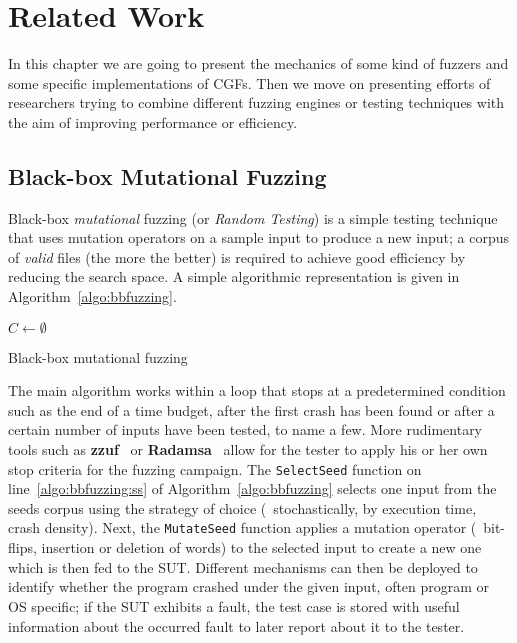 \chapter{Related Work}
\label{chap:related}

In this chapter we are going to present the mechanics of some kind of fuzzers
and some specific implementations of \acfp{CGF}. Then we move on presenting
efforts of researchers trying to combine different fuzzing engines or testing
techniques with the aim of improving performance or efficiency.

\section{Black-box Mutational Fuzzing}
\label{sec:bbfuzz}
Black-box \emph{mutational} fuzzing (or \emph{Random Testing}) is a simple
testing technique that uses mutation operators on a sample input to produce a
new input; a corpus of \emph{valid} files (the more the better) is required to
achieve good efficiency by reducing the search space. A simple algorithmic
representation is given in Algorithm~\ref{algo:bbfuzzing}.

\begin{algorithm}
    \DontPrintSemicolon%
    \BlankLine%
    $C \leftarrow \emptyset$\;
    \caption{Black-box mutational fuzzing}
\label{algo:bbfuzzing}
\end{algorithm}

The main algorithm works within a loop that stops at a predetermined condition
such as the end of a time budget, after the first crash has been found or after
a certain number of inputs have been tested, to name a few. More rudimentary
tools such as \textbf{zzuf}~\cite{hocevar2011zzuf} or
\textbf{Radamsa}~\cite{helin2015radamsa} allow for the tester to apply his or
her own stop criteria for the fuzzing campaign. The \texttt{SelectSeed} function
on line~\ref{algo:bbfuzzing:ss} of Algorithm~\ref{algo:bbfuzzing} selects one
input from the seeds corpus using the strategy of choice (\eg~stochastically, by
execution time, crash density). Next, the \texttt{MutateSeed} function applies a
mutation operator (\eg~bit-flips, insertion or deletion of words) to the
selected input to create a new one which is then fed to the \ac{SUT}. Different
mechanisms can then be deployed to identify whether the program crashed under
the given input, often program or \ac{OS} specific; if the \ac{SUT} exhibits a
fault, the test case is stored with useful information about the occurred fault
to later report about it to the tester.

